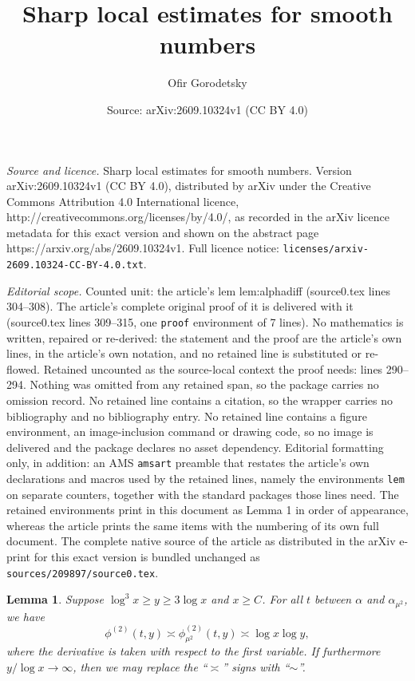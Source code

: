 \documentclass[10pt,a4paper]{amsart}
\title{Sharp local estimates for smooth numbers}
\author{Ofir Gorodetsky}
\date{Source: arXiv:2609.10324v1 (CC BY 4.0)}
\newtheorem{lem}{Lemma}
\begin{document}
\maketitle

\noindent\emph{Source and licence.} Sharp local estimates for smooth numbers. Version arXiv:2609.10324v1 (CC BY 4.0), distributed by arXiv under the Creative Commons Attribution 4.0 International licence, http://creativecommons.org/licenses/by/4.0/, as recorded in the arXiv licence metadata for this exact version and shown on the abstract page https://arxiv.org/abs/2609.10324v1. Full licence notice: \texttt{licenses/arxiv-2609.10324-CC-BY-4.0.txt}.\par\smallskip

\noindent\textit{Editorial scope.} Counted unit: the article's lem lem:alphadiff (source0.tex lines 304--308). The article's complete original proof of it is delivered with it (source0.tex lines 309--315, one \texttt{proof} environment of 7 lines). No mathematics is written, repaired or re-derived: the statement and the proof are the article's own lines, in the article's own notation, and no retained line is substituted or re-flowed.  Retained uncounted as the source-local context the proof needs: lines 290--294.  Nothing was omitted from any retained span, so the package carries no omission record.  No retained line contains a citation, so the wrapper carries no bibliography and no bibliography entry.  No retained line contains a figure environment, an image-inclusion command or drawing code, so no image is delivered and the package declares no asset dependency.  Editorial formatting only, in addition: an AMS \texttt{amsart} preamble that restates the article's own declarations and macros used by the retained lines, namely the environments \texttt{lem} on separate counters, together with the standard packages those lines need.  The retained environments print in this document as Lemma 1 in order of appearance, whereas the article prints the same items with the numbering of its own full document.  The complete native source of the article as distributed in the arXiv e-print for this exact version is bundled unchanged as \texttt{sources/209897/source0.tex}.
\begin{lem}\label{lem:phi}
	Suppose $\log^3 x \ge y \ge 3 \log x$ and $x \ge C$. For all $t$ between $\alpha$ and $\alpha_{\mu^2}$, we have 
	\[\phi^{(2)}(t,y) \asymp \phi^{(2)}_{\mu^2}(t,y) \asymp \log x \log y,\]
	where the derivative is taken with respect to the first variable. If furthermore $y/\log x \to \infty$, then we may replace the  ``$\asymp$'' signs with ``$\sim$''.
\end{lem}
\end{document}
